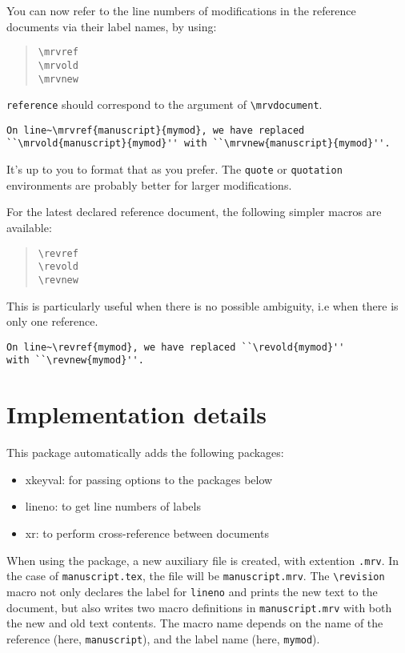 \documentclass{ltxdoc}
\begin{document}
You can now refer to the line numbers of modifications in the reference documents via their label names, by using:
\begin{quote}
\verb|\mrvref|   \\
\verb|\mrvold|   \\
\verb|\mrvnew|   
\end{quote}

\verb|reference| should correspond to the argument of \verb|\mrvdocument|.

\begin{verbatim}
On line~\mrvref{manuscript}{mymod}, we have replaced
``\mrvold{manuscript}{mymod}'' with ``\mrvnew{manuscript}{mymod}''.
\end{verbatim}

It's up to you to format that as you prefer.
The \verb|quote| or \verb|quotation| environments are probably better for larger modifications.

For the latest declared reference document, the following simpler macros are available:
\begin{quote}
\verb|\revref| \\
\verb|\revold| \\
\verb|\revnew| 
\end{quote}

This is particularly useful when there is no possible ambiguity, i.e when there is only one reference.

\begin{verbatim}
On line~\revref{mymod}, we have replaced ``\revold{mymod}''
with ``\revnew{mymod}''.
\end{verbatim}

\section{Implementation details}

This package automatically adds the following packages:
\begin{itemize}
\item \textsf{xkeyval}: for passing options to the packages below
\item \textsf{lineno}: to get line numbers of labels
\item \textsf{xr}: to perform cross-reference between documents
\end{itemize}

When using the package, a new auxiliary file is created, with extention \verb|.mrv|.
In the case of \verb|manuscript.tex|, the file will be \verb|manuscript.mrv|.
The \verb|\revision| macro not only declares the label for \verb|lineno| and prints the new text to the document, but also writes two macro definitions in \verb|manuscript.mrv| with both the new and old text contents.
The macro name depends on the name of the reference (here, \verb|manuscript|), and the label name (here, \verb|mymod|).
\end{document}
